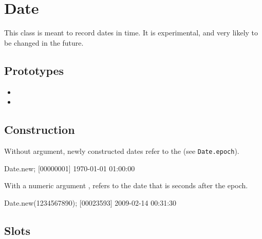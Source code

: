 \section{Date}

This class is meant to record dates in time.  It is experimental, and
very likely to be changed in the future.

\subsection{Prototypes}
\begin{itemize}
\item {}
\item {}
\end{itemize}

\subsection{Construction}

Without argument, newly constructed dates refer to the 
(see \lstinline|Date.epoch|).

\begin{urbiscript}
Date.new;
[00000001] 1970-01-01 01:00:00
\end{urbiscript}

With a numeric argument , refers to the date that is 
seconds after the epoch.

\begin{urbiscript}[firstnumber=last]
Date.new(1234567890);
[00023593] 2009-02-14 00:31:30
\end{urbiscript}

\subsection{Slots}

